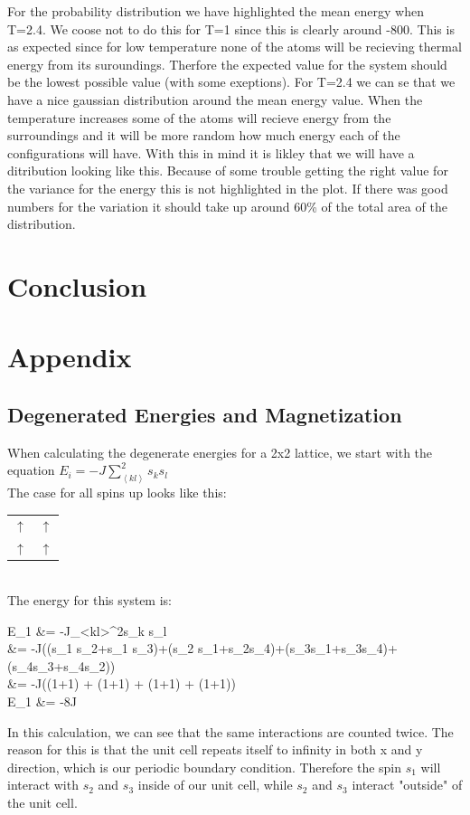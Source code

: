 \documentclass{article}
\begin{document}
{{	For the probability distribution we have highlighted the mean energy when T=2.4. We coose not to do this for T=1 since this is clearly around -800. This is as expected since for low temperature none of the atoms will be recieving thermal energy from its suroundings. Therfore the expected value for the system should be the lowest possible value (with some exeptions). For T=2.4 we can se that we have a nice gaussian distribution around the mean energy value. When the temperature increases some of the atoms will recieve energy from the surroundings and it will be more random how much energy each of the configurations will have. With this in mind it is likley that we will have a ditribution looking like this. Because of some trouble getting the right value for the variance for the energy this is not highlighted in the plot. If there was good numbers for the variation it should take up around 60\% of the total area of the distribution.

\newpage
\section{Conclusion}


\section{Appendix}
	\subsection{Degenerated Energies and Magnetization}

		When calculating the degenerate energies for a 2x2 lattice, we start with the equation $E_i=-J\sum\limits_{\left<kl\right>}^{2}s_ks_l$\\
		The case for all spins up looks like this:
		\begin{tabular}{c c}
			$\uparrow$ & $\uparrow$\\
			$\uparrow$ & $\uparrow$
		\end{tabular}\\

		The energy for this system is:
		\begin{flalign*}
			E_1 &= -J\sum\limits_{<kl>}^{2}s_k s_l\\
			&= -J((s_1 s_2+s_1 s_3)+(s_2 s_1+s_2s_4)+(s_3s_1+s_3s_4)+(s_4s_3+s_4s_2))\\
			&= -J((1+1) + (1+1) + (1+1) + (1+1))\\
			E_1 &= -8J
		\end{flalign*}
		In this calculation, we can see that the same interactions are counted twice. The reason for this is that the unit cell repeats itself to infinity in both x and y direction, which is our periodic boundary condition. Therefore the spin $s_1$ will interact with $s_2$ and $s_3$ inside of our unit cell, while $s_2$ and $s_3$ interact "outside" of the unit cell.

}}
\end{document}
